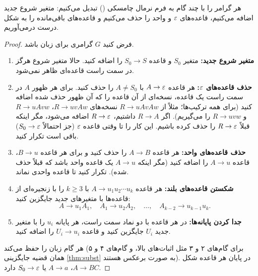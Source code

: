\begin{proofidea}
هر گرامر را با چند گام به فرم نرمال چامسکی () تبدیل می‌کنیم: متغیر شروع جدید اضافه می‌کنیم، قاعده‌های $\varepsilon$ و واحد را حذف می‌کنیم و قاعده‌های باقی‌مانده را به شکل درست درمی‌آوریم.
\end{proofidea}

\begin{proof}
فرض کنید $G$ گرامری برای زبان باشد.
\begin{enumerate}
\item \textbf{متغیر شروع جدید:} متغیر $S_0$ و قاعده $S_0\to S$ را اضافه کنید. حالا متغیر شروع هرگز در سمت راست قاعده‌ای ظاهر نمی‌شود.
\item \textbf{حذف قاعده‌های $\varepsilon$:} هر قاعده $A\to\varepsilon$ با $A\neq S_0$ را حذف کنید. برای هر ظهور $A$ در سمت راست یک قاعده، نسخه‌ای از آن قاعده را که آن ظهور حذف شده اضافه کنید (برای همه ترکیب‌ها؛ مثلاً از $R\to uAvAw$ نسخه‌های $R\to uvAw$، $R\to uAvw$ و $R\to uvw$ را می‌گیریم). اگر $R\to A$ داشتیم، $R\to\varepsilon$ اضافه می‌شود، مگر اینکه قبلاً $R\to\varepsilon$ را حذف کرده باشیم. این کار را تا وقتی قاعده $\varepsilon$ (جز احتمالاً $S_0\to\varepsilon$) باقی است تکرار کنید.
\item \textbf{حذف قاعده‌های واحد:} هر قاعده $A\to B$ را حذف کنید و برای هر قاعده $B\to u$، قاعده $A\to u$ را اضافه کنید (مگر اینکه $A\to u$ یک قاعده واحد باشد که قبلاً حذف شده). تکرار کنید تا قاعده واحدی نماند.
\item \textbf{شکستن قاعده‌های بلند:} هر قاعده $A\to u_1u_2\cdots u_k$ با $k\ge3$ را با زنجیره‌ای از قاعده‌ها با متغیرهای جدید جایگزین کنید:
\[A\to u_1A_1,\quad A_1\to u_2A_2,\quad\dots,\quad A_{k-2}\to u_{k-1}u_k.\]
\item \textbf{جدا کردن پایانه‌ها:} در هر قاعده با دو نماد سمت راست، هر پایانه $u_i$ را با متغیر جدید $U_i$ جایگزین کنید و قاعده $U_i\to u_i$ را اضافه کنید.
\end{enumerate}
هر گام زبان را حفظ می‌کند (برای گام‌های ۲ و ۳ مثل اثبات‌های بالا، و گام‌های ۴ و ۵ همان قضیه جایگزینی \ref{thm:subst} به صورت برعکس هستند). در پایان هر قاعده شکل $A\to BC$، $A\to a$ یا $S_0\to\varepsilon$ دارد.
\end{proof}

